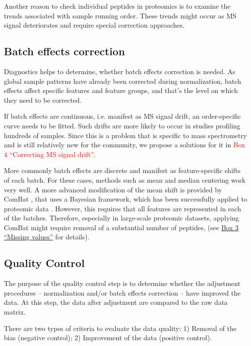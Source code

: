\documentclass[num-refs]{wiley-article}
\begin{document}
Another reason to check individual peptides in proteomics is to examine the trends associated with sample running order. These trends might occur as MS signal deteriorates and require special correction approaches.

\subsection{Batch effects correction}

Diagnostics helps to determine, whether batch effects correction is needed. As global sample patterns have already been corrected during normalization, batch effects affect specific features and feature groups, and that’s the level on which they need to be corrected.

If batch effects are continuous, i.e. manifest as MS signal drift, an order-specific curve needs to be fitted. Such drifts are more likely to occur in studies profiling hundreds of samples. Since this is a problem that is specific to mass spectrometry and is still relatively new for the community, we propose a solutions for it in  \textcolor{red}{Box 4 “Correcting MS signal drift”}.

More commonly batch effects are discrete and manifest as feature-specific shifts of each batch. For these cases, methods such as mean and median centering work very well. A more advanced modification of the mean shift is provided by ComBat \cite{Johnson:2007aa}, that uses a Bayesian framework, which has been successfully applied to proteomic data \cite{Lee:2019aa}. However, this requires that all features are represented in each of the batches. Therefore, especially in large-scale proteomic datasets, applying ComBat might require removal of  a substantial number of peptides, (see \hyperref[box:Box3_missingness]{Box 3 “Missing values”} for details).

\subsection{Quality Control}

The purpose of the quality control step is to determine whether the adjustment procedures – normalization and/or batch effects correction – have improved the data. At this step, the data after adjustment are compared to the raw data matrix.

There are two types of criteria to evaluate the data quality: 1) Removal of the bias (negative control); 2) Improvement of the data (positive control).
\end{document}
